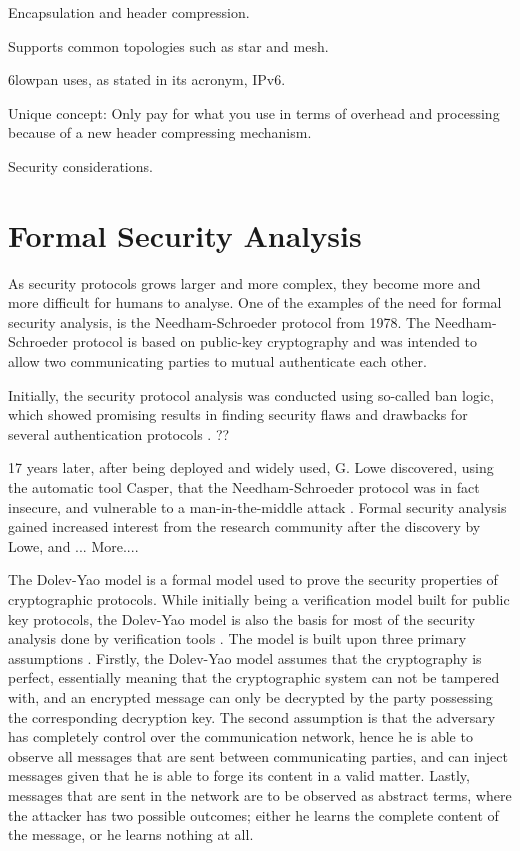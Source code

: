 Encapsulation and header compression. 

Supports common topologies such as star and mesh.

\gls{6lowpan} uses, as stated in its acronym, IPv6.

Unique concept: Only pay for what you use in terms of overhead and processing because of a new header compressing mechanism.



Security considerations.



\section{Formal Security Analysis} 


As security protocols grows larger and more complex, they become more and more difficult for humans to analyse. One of the examples of the need for formal security analysis, is the Needham-Schroeder protocol \cite{Needham:1978} from 1978. The Needham-Schroeder protocol is based on public-key cryptography and was intended to allow two communicating parties to mutual authenticate each other.

Initially, the security protocol analysis was conducted using so-called \gls{ban} logic, which showed promising results in finding security flaws and drawbacks for several authentication protocols \cite{burrows1989logic}. ?? %

17 years later, after being deployed and widely used, G. Lowe discovered, using the automatic tool Casper, that the Needham-Schroeder protocol was in fact insecure, and vulnerable to a man-in-the-middle attack \cite{lowe1996}. Formal security analysis gained increased interest from the research community after the discovery by Lowe, and ... More....

The Dolev-Yao model is a formal model used to prove the security properties of cryptographic protocols. While initially being a verification model built for public key protocols, the Dolev-Yao model is also the basis for most of the security analysis done by verification tools \cite{cremers2005operational}. The model is built upon three primary assumptions \cite{dolev1983security}. Firstly, the Dolev-Yao model assumes that the cryptography is perfect, essentially meaning that the cryptographic system can not be tampered with, and an encrypted message can only be decrypted by the party possessing the corresponding decryption key. The second assumption is that the adversary has completely control over the communication network, hence he is able to observe all messages that are sent between communicating parties, and can inject messages given that he is able to forge its content in a valid matter. Lastly, messages that are sent in the network are to be observed as abstract terms, where the attacker has two possible outcomes; either he learns the complete content of the message, or he learns nothing at all. 

